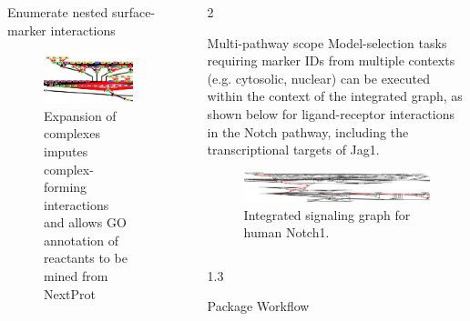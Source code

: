 \documentclass[final]{beamer}
\newlength{\sepwidth}
\newlength{\colwidth}
\newcommand{\separatorcolumn}{\begin{column}{\sepwidth}\end{column}}
\begin{document}
\begin{frame}[t,fragile]
\begin{columns}[t]
\begin{column}{\colwidth}
  \begin{exampleblock}{Enumerate nested surface-marker interactions}
    \begin{figure}
      \centering
      \includegraphics[scale=1.0]{Image/ontology_enumeration_NODEID.pdf}
      \caption{Expansion of complexes imputes complex-forming interactions and allows GO annotation of reactants to be mined from NextProt \cite{lane2012nextprot}}
    \end{figure}
  \end{exampleblock}

\end{column}

\separatorcolumn

\begin{column}{2\colwidth}
  \begin{block}{Multi-pathway scope}
    Model-selection tasks requiring marker IDs from multiple contexts (e.g. cytosolic, nuclear) can be executed within the context of the integrated graph, as shown below for ligand-receptor interactions in the Notch pathway, including the transcriptional targets of Jag1.
    
    \begin{figure}
      \centering
      \includegraphics[scale=0.5]{Image/notch_path.pdf}
      \caption{Integrated signaling graph for human Notch1.}
    \end{figure}
    
  \end{block}
  \begin{columns}[t] %
    \begin{column}{1.3\colwidth}
      \begin{block}{Package Workflow}


\end{block}
\end{column}
\end{columns}
\end{column}
\end{columns}
\end{frame}
\end{document}
